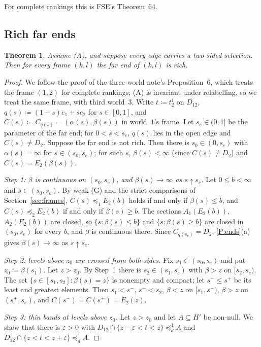 \documentclass[11pt]{article}
\newtheorem{theorem}{Theorem}
\theoremstyle{definition}\newtheorem{definition}[theorem]{Definition}
\theoremstyle{remark}\newtheorem{remark}[theorem]{Remark}
\begin{document}
For complete rankings this is FSE's Theorem~64.

\subsection{Rich far ends}\label{sec:rich}

\begin{theorem}\label{thm:rich}
Assume (A), and suppose every edge carries a two-sided selection. Then for
every frame $(k,l)$ the far end of $(k,l)$ is rich.
\end{theorem}
\begin{proof}
We follow the proof of the three-world note's Proposition~6, which treats
the frame $(1,2)$ for complete rankings; (A) is invariant under relabelling,
so we treat the same frame, with third world~$3$. Write $t\coloneqq t^1_2$
on $D_{12}$, $q(s)\coloneqq(1-s)e_1+se_2$ for $s\in[0,1]$, and
$C(s)\coloneqq C_{q(s)}=(\alpha(s),\beta(s))$ in world~$1$'s frame. Let
$s_e\in(0,1]$ be the parameter of the far end; for $0<s<s_e$, $q(s)$ lies in
the open edge and $C(s)\ne D_2$. Suppose the far end is not rich. Then there
is $s_0\in(0,s_e)$ with $\alpha(s)=\infty$ for $s\in(s_0,s_e)$; for such $s$,
$\beta(s)<\infty$ (since $C(s)\ne D_2$) and $C(s)=E_2(\beta(s))$.

\emph{Step 1: $\beta$ is continuous on $(s_0,s_e)$, and $\beta(s)\to\infty$
as $s\uparrow s_e$.} Let $0\le b<\infty$ and $s\in(s_0,s_e)$. By weak (G) and
the strict comparisons of Section~\ref{sec:frames},
$C(s)\preceq_1E_2(b)$ holds if and only if $\beta(s)\le b$, and
$C(s)\preceq_2E_2(b)$ if and only if $\beta(s)\ge b$. The sections
$A_1(E_2(b))$, $A_2(E_2(b))$ are closed, so $\{s:\beta(s)\le b\}$ and
$\{s:\beta(s)\ge b\}$ are closed in $(s_0,s_e)$ for every $b$, and $\beta$
is continuous there. Since $C_{q(s_e)}=D_2$, \ref{P:ends}(a) gives
$\beta(s)\to\infty$ as $s\uparrow s_e$.

\emph{Step 2: levels above $z_0$ are crossed from both sides.} Fix
$s_1\in(s_0,s_e)$ and put $z_0\coloneqq\beta(s_1)$. Let $z>z_0$. By Step~1
there is $s_2\in(s_1,s_e)$ with $\beta>z$ on $[s_2,s_e)$. The set
$\{s\in[s_1,s_2]:\beta(s)=z\}$ is nonempty and compact; let $s^-\le s^+$ be
its least and greatest elements. Then $s_1<s^-$, $s^+<s_2$, $\beta<z$ on
$[s_1,s^-)$, $\beta>z$ on $(s^+,s_e)$, and $C(s^-)=C(s^+)=E_2(z)$.

\emph{Step 3: thin bands at levels above $z_0$.} Let $z>z_0$ and let
$A\subseteq H'$ be non-null. We show that there is $\varepsilon>0$ with
$D_{12}\cap\{z-\varepsilon<t<z\}\preceq^1_dA$ and
$D_{12}\cap\{z<t<z+\varepsilon\}\preceq^1_dA$.


\end{proof}
\end{document}

